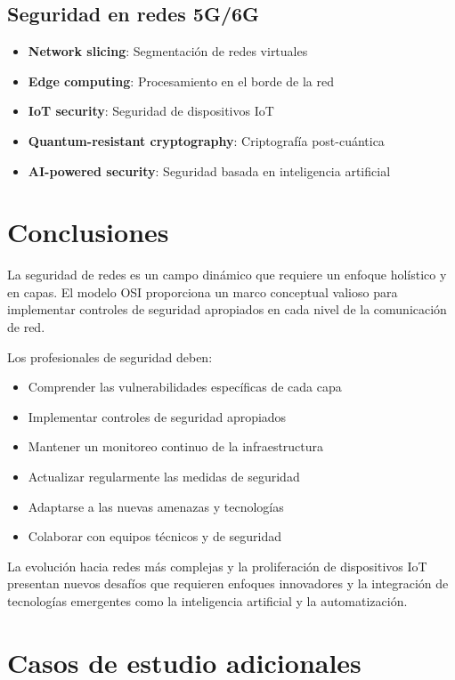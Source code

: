 \subsection{Seguridad en redes 5G/6G}

\begin{itemize}
    \item \textbf{Network slicing}: Segmentación de redes virtuales
    \item \textbf{Edge computing}: Procesamiento en el borde de la red
    \item \textbf{IoT security}: Seguridad de dispositivos IoT
    \item \textbf{Quantum-resistant cryptography}: Criptografía post-cuántica
    \item \textbf{AI-powered security}: Seguridad basada en inteligencia artificial
\end{itemize}

\section{Conclusiones}

La seguridad de redes es un campo dinámico que requiere un enfoque holístico y en capas. El modelo OSI proporciona un marco conceptual valioso para implementar controles de seguridad apropiados en cada nivel de la comunicación de red.

Los profesionales de seguridad deben:

\begin{itemize} 
    \item Comprender las vulnerabilidades específicas de cada capa
    \item Implementar controles de seguridad apropiados
    \item Mantener un monitoreo continuo de la infraestructura
    \item Actualizar regularmente las medidas de seguridad
    \item Adaptarse a las nuevas amenazas y tecnologías
    \item Colaborar con equipos técnicos y de seguridad
\end{itemize}

La evolución hacia redes más complejas y la proliferación de dispositivos IoT presentan nuevos desafíos que requieren enfoques innovadores y la integración de tecnologías emergentes como la inteligencia artificial y la automatización.

\section{Casos de estudio adicionales}

